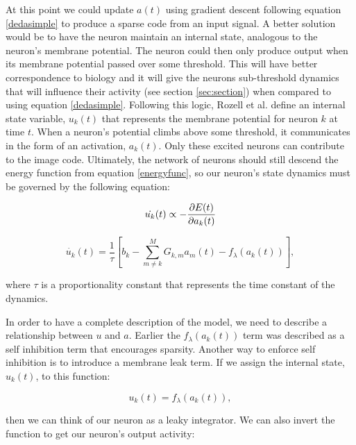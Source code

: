 At this point we could update $a(t)$ using gradient descent following equation \eqref{dedasimple} to produce a sparse code from an input signal. A better solution would be to have the neuron maintain an internal state, analogous to the neuron's membrane potential. The neuron could then only produce output when its membrane potential passed over some threshold. This will have better correspondence to biology and it will give the neurons sub-threshold dynamics that will influence their activity (see section \ref{sec:section}) when compared to using equation \ref{dedasimple}. Following this logic, Rozell et al. \citeyearpar{rozell2008sparse} define an internal state variable, $u_{k}(t)$ that represents the membrane potential for neuron $k$ at time $t$. When a neuron's potential climbs above some threshold, it communicates in the form of an activation, $a_{k}(t)$. Only these excited neurons can contribute to the image code. Ultimately, the network of neurons should still descend the energy function from equation \eqref{energyfunc}, so our neuron's state dynamics must be governed by the following equation:

\begin{displaymath}
    \dot{u_{k}}(t) \propto - \frac{\partial E(t)} {\partial a_{k}(t)} \\
\end{displaymath}

\begin{equation}\label{udot}
    \dot{u_{k}}(t) = \frac{1}{\tau} \left[b_{k} - \sum_{m \neq k}^{M}G_{k,m}a_{m}(t) - f_{\lambda}(a_{k}(t)) \right],
\end{equation}

\noindent where $\tau$ is a proportionality constant that represents the time constant of the dynamics.

In order to have a complete description of the model, we need to describe a relationship between $u$ and $a$. Earlier the $f_{\lambda}(a_{k}(t))$ term was described as a self inhibition term that encourages sparsity. Another way to enforce self inhibition is to introduce a membrane leak term. If we assign the internal state, $u_{k}(t)$, to this function:

\begin{equation}\label{ufunca}
    u_k(t) = f_{\lambda}(a_{k}(t)),
\end{equation}

\noindent then we can think of our neuron as a leaky integrator. We can also invert the function to get our neuron's output activity:

